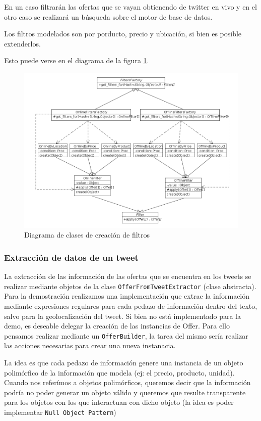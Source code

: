 En un caso filtrar\'an las ofertas que se vayan obtienendo de twitter en vivo y en el otro caso se realizar\'a un b\'usqueda sobre el motor de base de datos.

Los filtros modelados son por porducto, precio y ubicaci\'on, si bien es posible extenderlos.

Esto puede verse en el diagrama de la figura \ref{fig:class_filter_factory}. 

\begin{figure}[h]
\centerline{\includegraphics[width=0.6\paperwidth]{./imgs/class_diagram_filters_factory.png}}
\caption{Diagrama de clases de creaci\'on de filtros}
\label{fig:class_filter_factory} 
\end{figure}

\subsubsection{Extracci\'on de datos de un tweet}
La extracci\'on de las informaci\'on de las ofertas que se encuentra en los tweets se realizar mediante objetos de la clase \texttt{OfferFromTweetExtractor} (clase abstracta).
Para la demostraci\'on realizamos una implementaci\'on que extrae la informaci\'on mediante expresiones regulares para cada pedazo de informaci\'on dentro del texto, salvo para la geolocalizaci\'on del tweet.
Si bien no est\'a implementado para la demo, es deseable delegar la creaci\'on de las instancias de Offer. Para ello pensamos realizar mediante un \texttt{OfferBuilder}, la tarea del mismo ser\'ia realizar las acciones necesarias para crear una nueva instanacia.

La idea es que cada pedazo de informaci\'on genere una instancia de un objeto polim\'orfico de la informaci\'on que modela (ej: el precio, producto, unidad).
Cuando nos refer\'imos a objetos polim\'orficos, queremos decir que la informaci\'on podr\'ia no poder generar un objeto v\'alido y queremos que resulte transparente para los objetos con los que interactuan con dicho objeto (la idea es poder implementar \texttt{Null Object Pattern})

